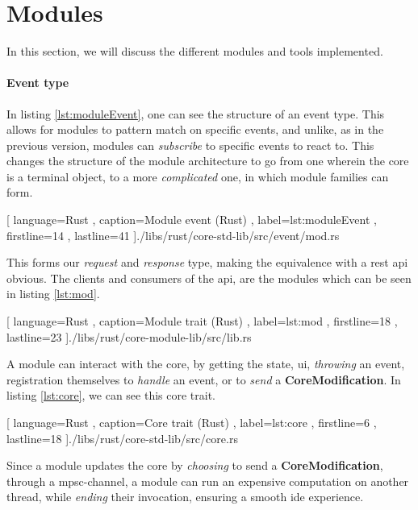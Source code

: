 \section{Modules} \label{sec:modules}

In this section, we will discuss the different modules and tools implemented.

\paragraph{Event type} In listing \ref{lst:moduleEvent}, one can see the
structure of an event type. This allows for modules to pattern match on specific
events, and unlike, as in the previous version, modules can \textit{subscribe}
to specific events to react to. This changes the structure of the module
architecture to go from one wherein the core is a terminal object, to a more
\textit{complicated} one, in which module families can form.

\begin{code}[H]
  
    [ language=Rust
    , caption={Module event (Rust)}
    , label=lst:moduleEvent
    , firstline=14
    , lastline=41
    ]{./libs/rust/core-std-lib/src/event/mod.rs}
\end{code}

This forms our \textit{request} and \textit{response} type, making the
equivalence with a \gls*{rest} \gls*{api} obvious. The clients and consumers
of the \gls*{api}, are the modules which can be seen in listing \ref{lst:mod}.

\begin{center}
  
    [ language=Rust
    , caption={Module trait (Rust)}
    , label=lst:mod
    , firstline=18
    , lastline=23
    ]{./libs/rust/core-module-lib/src/lib.rs}
\end{center}

A module can interact with the core, by getting the state, \gls*{ui},
\textit{throwing} an event, registration themselves to \textit{handle} an
event, or to \textit{send} a \textbf{CoreModification}. In listing
\ref{lst:core}, we can see this core trait.

\begin{code}[H]
  
    [ language=Rust
    , caption={Core trait (Rust)}
    , label=lst:core
    , firstline=6
    , lastline=18
    ]{./libs/rust/core-std-lib/src/core.rs}
\end{code}

Since a module updates the core by \textit{choosing} to send a
\textbf{CoreModification}, through a \gls*{mpsc}-channel, a module can run an
expensive computation on another thread, while \textit{ending} their
invocation, ensuring a smooth \gls*{ide} experience.


